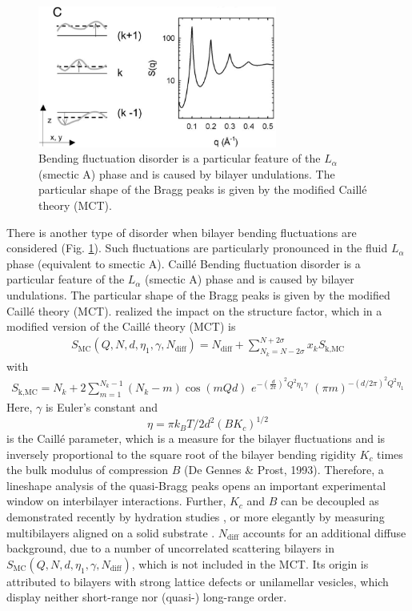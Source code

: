 \begin{figure}[htb]
\begin{center}
\includegraphics[width=0.7\textwidth,height=0.4\textwidth]{ModifiedCailleTheorySQ.png}
\end{center}
\caption{Bending fluctuation disorder is a particular feature of
the $L_\alpha$ (smectic A) phase and is caused by bilayer
undulations. The particular shape of the Bragg peaks is given by
the modified Caill\'e theory (MCT).}
\label{ModifiedCailleTheorySQ}
\end{figure}

There is another type of disorder when bilayer bending fluctuations
are considered (Fig. \ref{ModifiedCailleTheorySQ}). Such
fluctuations are particularly pronounced in the fluid $L_\alpha$
phase (equivalent to smectic A). Caill\'e Bending fluctuation
disorder is a particular feature of the $L_\alpha$ (smectic A) phase
and is caused by bilayer undulations. The particular shape of the
Bragg peaks is given by the modified Caill\'e theory (MCT).
\cite{Caille1972} realized the impact on the structure factor, which
in a modified version \cite{Zhang1994} of the Caill\'e theory (MCT)
is
\begin{align}
S_\text{MC}(Q,N,d,\eta_1,\gamma, N_\text{diff}) = N_\text{diff}+
\sum_{N_k=N-2\sigma}^{N+2\sigma} x_k S_\text{k,MC}
\end{align}
with
\begin{align}
S_\text{k,MC} = N_k + 2 \sum_{m=1}^{N_k-1} (N_k-m) \cos(mQd) \,\,
e^{ -\left(\frac{d}{2\pi}\right)^2 Q^2 \eta_1 \gamma } \,\, (\pi
m)^{-(d/2\pi)^2Q^2\eta_1}
\end{align}
Here, $\gamma$ is Euler's constant and
$$ \eta = \pi k_B T / 2d^2(BK_c)^{1/2}$$
is the Caill\'e parameter, which is a measure for the bilayer
fluctuations and is inversely proportional to the square root of the
bilayer bending rigidity $K_c$ times the bulk modulus of compression
$B$ (De Gennes \& Prost, 1993). Therefore, a lineshape analysis of
the quasi-Bragg peaks opens an important experimental window on
interbilayer interactions. Further, $K_c$ and $B$ can be decoupled
as demonstrated recently by hydration studies
\cite{Petrache1998,Pabst2003}, or more elegantly by measuring
multibilayers aligned on a solid substrate \cite{Lyatskaya2000}.
$N_\text{diff}$ accounts for an additional diffuse background, due
to a number of uncorrelated scattering bilayers in
$S_\text{MC}(Q,N,d,\eta_1,\gamma, N_\text{diff}) $, which is not
included in the MCT. Its origin is attributed to bilayers with
strong lattice defects or unilamellar vesicles, which display
neither short-range nor (quasi-) long-range order.

